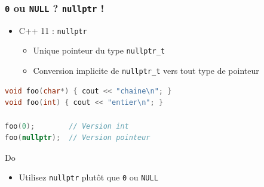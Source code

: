 \documentclass[C++.tex]{subfiles}
\begin{document}
\begin{frame}[fragile]
	\frametitle{\lstinline|0| ou \lstinline|NULL| ? \lstinline|nullptr| !}
	\begin{itemize}
		\item C++ 11 : \lstinline|nullptr|
		\begin{itemize}
			\item Unique pointeur du type \lstinline|nullptr_t|
			\item Conversion implicite de \lstinline|nullptr_t| vers tout type de pointeur
		\end{itemize}
	\end{itemize}

	\begin{lstlisting}[language=C++]
void foo(char*) { cout << "chaine\n"; }
void foo(int) { cout << "entier\n"; }

foo(0);        // Version int
foo(nullptr);  // Version pointeur\end{lstlisting}

	\begin{exampleblock}{Do}
		\begin{itemize}
			\item Utilisez \lstinline|nullptr| plutôt que \lstinline|0| ou \lstinline|NULL|
		\end{itemize}
	\end{exampleblock}
\end{frame}
\end{document}
